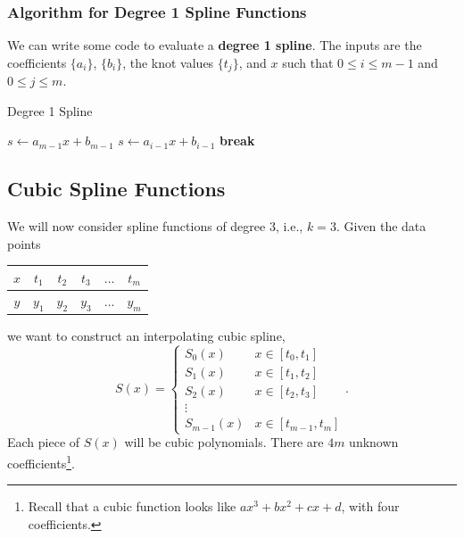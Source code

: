 \documentclass[letterpaper]{article}
\begin{document}
\subsubsection{Algorithm for Degree 1 Spline Functions}
We can write some code to evaluate a \textbf{degree 1 spline}. The inputs are the coefficients $\{a_i\}$, $\{b_i\}$, the knot values $\{t_j\}$, and $x$ such that $0 \leq i \leq m - 1$ and $0 \leq j \leq m$. 
\begin{algorithm}[H]
    \caption{Degree 1 Spline}
    \begin{algorithmic}[1]
            \State $s \gets a_{m - 1} x + b_{m - 1}$
                    \State $s \gets a_{i - 1} x + b_{i - 1}$ 
                    \State \textbf{break}
                \EndIf 
            \EndFor 
        \EndFunction
    \end{algorithmic}
\end{algorithm}

\subsection{Cubic Spline Functions}
We will now consider spline functions of degree 3, i.e., $k = 3$. Given the data points 
\begin{center}
    \begin{tabular}{c|c c c c c}
        $x$ & $t_1$ & $t_2$ & $t_3$ & $\hdots$ & $t_m$ \\
        \hline  
        $y$ & $y_1$ & $y_2$ & $y_3$ & $\hdots$ & $y_m$
    \end{tabular}
\end{center}
we want to construct an interpolating cubic spline,
\[S(x) = \begin{cases}
    S_{0}(x) & x \in [t_0, t_1] \\ 
    S_{1}(x) & x \in [t_1, t_2] \\ 
    S_{2}(x) & x \in [t_2, t_3] \\ 
    \vdots \\ 
    S_{m - 1}(x) & x \in [t_{m - 1}, t_m]
\end{cases}.\]
Each piece of $S(x)$ will be cubic polynomials. There are $4m$ unknown coefficients\footnote{Recall that a cubic function looks like $ax^3 + bx^2 + cx + d$, with four coefficients.}. 
\end{document}
